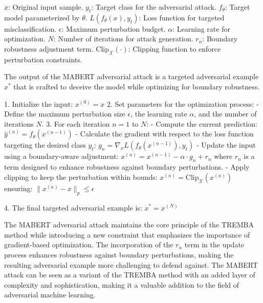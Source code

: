 $x$: Original input sample.
$y_t$: Target class for the adversarial attack.
$f_{\theta}$: Target model parameterized by $\theta$.
$L(f_{\theta}(x), y_t)$: Loss function for targeted misclassification.
$\epsilon$: Maximum perturbation budget.
$\alpha$: Learning rate for optimization.
$N$: Number of iterations for attack generation.
$r_n$: Boundary robustness adjustment term.
$\text{Clip}_{\mathcal{X}}(\cdot)$: Clipping function to enforce perturbation constraints.

The output of the MABERT adversarial attack is a targeted adversarial example $x^*$ that is crafted to deceive the model while optimizing for boundary robustness.

1. Initialize the input:
   $x^{(0)} = x$
2. Set parameters for the optimization process:
   - Define the maximum perturbation size $\epsilon$, the learning rate $\alpha$, and the number of iterations $N$.
3. For each iteration $n = 1$ to $N$:
   - Compute the current prediction:
   $\hat{y}^{(n)} = f_{\theta}(x^{(n-1)})$
   - Calculate the gradient with respect to the loss function targeting the desired class $y_t$:
   $g_n = \nabla_x L(f_{\theta}(x^{(n-1)}), y_t)$
   - Update the input using a boundary-aware adjustment:
   $x^{(n)} = x^{(n-1)} - \alpha \cdot g_n + r_n$
   where $r_n$ is a term designed to enhance robustness against boundary perturbations.
   - Apply clipping to keep the perturbation within bounds:
   $x^{(n)} = \text{Clip}_{\mathcal{X}}(x^{(n)})$
   ensuring:
   $\|x^{(n)} - x\|_p \leq \epsilon$

4. The final targeted adversarial example is:
   $x^* = x^{(N)}$

The MABERT adversarial attack maintains the core principle of the TREMBA method while introducing a new constraint that emphasizes the importance of gradient-based optimization. The incorporation of the $r_n$ term in the update process enhances robustness against boundary perturbations, making the resulting adversarial example more challenging to defend against. The MABERT attack can be seen as a variant of the TREMBA method with an added layer of complexity and sophistication, making it a valuable addition to the field of adversarial machine learning.